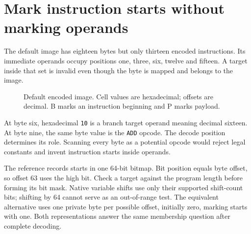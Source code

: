 \section{Mark instruction starts without marking operands}\label{vm-boundaries}
The default image has eighteen bytes but only thirteen encoded instructions.
Its immediate operands occupy positions one, three, six, twelve and fifteen. A target
inside that set is invalid even though the byte is mapped and belongs to the image.

\begin{figure}[htbp]
  \centering
  \caption{Default encoded image. Cell values are hexadecimal; offsets are decimal. B marks an instruction beginning and P marks payload.}
\end{figure}

At byte six, hexadecimal \texttt{10} is a branch target operand meaning decimal
sixteen. At byte nine, the same byte value is the \texttt{ADD} opcode. The decode
position determines its role. Scanning every byte as a potential opcode would reject
legal constants and invent instruction starts inside operands.

The reference records starts in one 64-bit bitmap. Bit position equals byte offset,
so offset 63 uses the high bit. Check a target against the program length before
forming its bit mask. Native variable shifts use only their supported shift-count
bits; shifting by 64 cannot serve as an out-of-range test. The equivalent alternative
uses one private byte per possible offset, initially zero, marking starts with one.
Both representations answer the same membership question after complete decoding.

